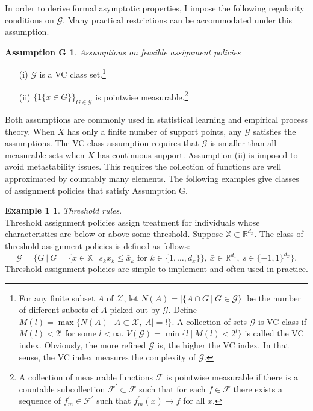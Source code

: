 \documentclass[12pt,oneside,reqno,english]{amsart}
\theoremstyle{definition}
\newtheorem*{ex1}{Example 1}
\newtheorem*{asmG}{Assumption G}
\begin{document}
In order to derive formal asymptotic properties, I impose the following regularity conditions on $\mathcal{G}$. 
Many practical restrictions can be accommodated under this assumption. 
\begin{asmG} \textit{Assumptions on feasible assignment policies}
\begin{itemize}
    \item[{(i)} ] $\mathcal{G}$ is a VC class set.\footnote{For any finite subset $A$ of $\mathcal{X}$, 
   let $N(A)=|\{A\cap G\ |\ G\in \mathcal{G} \}|$ be the number of different subsets of $A$ picked out by $\mathcal{G}$. 
   Define $M(l)=\max\{N(A)\ | \ A\subset \mathcal{X}, |A|=l\}$. A collection of sets $\mathcal{G}$ is VC class if $M(l)<2^{l}$ for some $l<\infty$. 
   $V(\mathcal{G})=\min\{l \ | \ M(l)<2^{l}\}$ is called the VC index. Obviously, the more refined $\mathcal{G}$ is, the higher the VC index. In that sense, the VC index measures the complexity of $\mathcal{G}$.}
    \item[{(ii)}] $\{1\{x\in G\}\}_{G\in \mathcal{G}}$ is pointwise measurable.\footnote{A collection of measurable functions $\mathcal{F}$ is pointwise measurable if 
    there is a countable subcollection $\mathcal{F}^{\prime}\subset \mathcal{F}$ such that for each $f\in \mathcal{F}$ there exists a sequence of $f^{\prime}_{m}\in \mathcal{F}^{\prime}$ such that $f^{\prime}_{m}(x)\rightarrow f$ for all $x$.}
    \end{itemize}    
\end{asmG}
Both assumptions are commonly used in statistical learning and empirical process theory.
When $X$ has only a finite number of support points, any $\mathcal{G}$ satisfies the assumptions. 
The VC class assumption requires that $\mathcal{G}$ is smaller than all measurable sets when $X$ has continuous support. 
Assumption (ii) is imposed to avoid metastability issues. This requires the collection of functions are well approximated by countably many elements.  
The following examples give classes of assignment policies that satisfy Assumption G. 
\begin{ex1}
\textit{Threshold rules}.\\ Threshold assignment policies assign treatment for individuals whose characteristics are below or above some threshold.  
Suppose $\mathbb{X}\subset \mathbb{R}^{d_{x}}$. The class of threshold assignment policies is defined as follows:
\[\mathcal{G}=\{G\ |\ G=\{x\in \mathbb{X} \ | \ s_{k}x_{k}\leq \bar{x}_{k}\mbox{ for } k\in \{1,\ldots,d_{x}\}  \},\ \bar{x}\in \mathbb{R}^{d_{x}},\ s\in\{-1,1\}^{d_{x}} \}.\]
Threshold assignment policies are simple to implement and often used in practice. 
\end{ex1}
\end{document}

